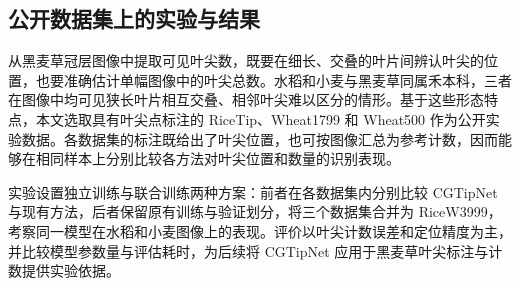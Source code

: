 \subsection{公开数据集上的实验与结果}
\label{sec:cgtipnet-experiments}
从黑麦草冠层图像中提取可见叶尖数，既要在细长、交叠的叶片间辨认叶尖的位置，也要准确估计单幅图像中的叶尖总数。水稻和小麦与黑麦草同属禾本科，三者在图像中均可见狭长叶片相互交叠、相邻叶尖难以区分的情形。基于这些形态特点，本文选取具有叶尖点标注的 RiceTip、Wheat1799 和 Wheat500 作为公开实验数据。各数据集的标注既给出了叶尖位置，也可按图像汇总为参考计数，因而能够在相同样本上分别比较各方法对叶尖位置和数量的识别表现。\par
实验设置独立训练与联合训练两种方案：前者在各数据集内分别比较 CGTipNet 与现有方法，后者保留原有训练与验证划分，将三个数据集合并为 RiceW3999，考察同一模型在水稻和小麦图像上的表现。评价以叶尖计数误差和定位精度为主，并比较模型参数量与评估耗时，为后续将 CGTipNet 应用于黑麦草叶尖标注与计数提供实验依据。


